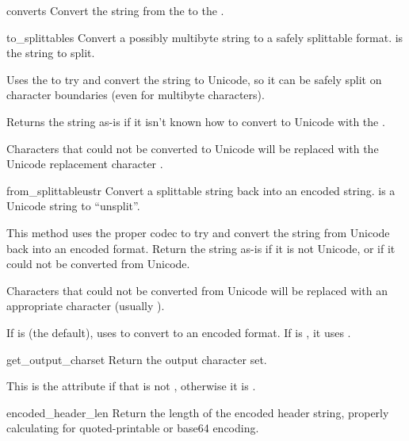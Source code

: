 \begin{methoddesc}{convert}{s}
Convert the string  from the  to the
.
\end{methoddesc}

\begin{methoddesc}{to_splittable}{s}
Convert a possibly multibyte string to a safely splittable format.
 is the string to split.

Uses the  to try and convert the string to Unicode,
so it can be safely split on character boundaries (even for multibyte
characters).

Returns the string as-is if it isn't known how to convert  to
Unicode with the .

Characters that could not be converted to Unicode will be replaced
with the Unicode replacement character .
\end{methoddesc}

\begin{methoddesc}{from_splittable}{ustr}
Convert a splittable string back into an encoded string.  
is a Unicode string to ``unsplit''.

This method uses the proper codec to try and convert the string from
Unicode back into an encoded format.  Return the string as-is if it is
not Unicode, or if it could not be converted from Unicode.

Characters that could not be converted from Unicode will be replaced
with an appropriate character (usually ).

If  is  (the default), uses
 to convert to an 
encoded format.  If  is , it uses
.
\end{methoddesc}

\begin{methoddesc}{get_output_charset}{}
Return the output character set.

This is the  attribute if that is not ,
otherwise it is .
\end{methoddesc}

\begin{methoddesc}{encoded_header_len}{}
Return the length of the encoded header string, properly calculating
for quoted-printable or base64 encoding.
\end{methoddesc}


